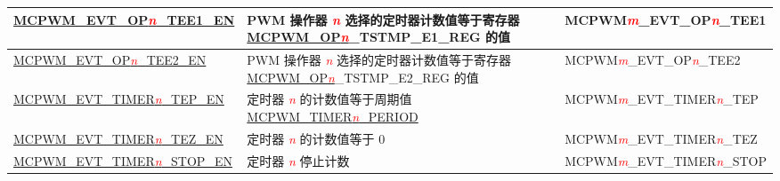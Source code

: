 \begin{ThreePartTable}
\begin{longtable}[c]{| l | L{7cm} | l |}
    \hyperref[fielddesc:MCPWMEVTOPNTEE1EN]{MCPWM\_EVT\_OP\textcolor{red}{\it{n}}\_TEE1\_EN}
    & PWM 操作器 \textcolor{red}{\it{n}} 选择的定时器计数值等于寄存器 \hyperref[regdesc:MCPWMOPNTSTMPE1REG]{MCPWM\_OP\textcolor{red}{\it{n}}}\_TSTMP\_E1\_REG 的值
    & MCPWM\textcolor{red}{\it{m}}\_EVT\_OP\textcolor{red}{\it{n}}\_TEE1    \\\hline
    \hyperref[fielddesc:MCPWMEVTOPNTEE2EN]{MCPWM\_EVT\_OP\textcolor{red}{\it{n}}\_TEE2\_EN}
    & PWM 操作器 \textcolor{red}{\it{n}} 选择的定时器计数值等于寄存器 \hyperref[regdesc:MCPWMOPNTSTMPE2REG]{MCPWM\_OP\textcolor{red}{\it{n}}}\_TSTMP\_E2\_REG 的值
    & MCPWM\textcolor{red}{\it{m}}\_EVT\_OP\textcolor{red}{\it{n}}\_TEE2    \\\hline
    \hyperref[fielddesc:MCPWMEVTTIMER0TEPEN]{MCPWM\_EVT\_TIMER\textcolor{red}{\it{n}}\_TEP\_EN}
    & 定时器 \textcolor{red}{\it{n}} 的计数值等于周期值 \hyperref[fielddesc:MCPWMTIMERNPERIOD]{MCPWM\_TIMER\textcolor{red}{\it{n}}\_PERIOD}
    & MCPWM\textcolor{red}{\it{m}}\_EVT\_TIMER\textcolor{red}{\it{n}}\_TEP    \\\hline
    \hyperref[fielddesc:MCPWMEVTTIMER0TEZEN]{MCPWM\_EVT\_TIMER\textcolor{red}{\it{n}}\_TEZ\_EN}
    & 定时器 \textcolor{red}{\it{n}} 的计数值等于 0
    & MCPWM\textcolor{red}{\it{m}}\_EVT\_TIMER\textcolor{red}{\it{n}}\_TEZ    \\\hline
    \hyperref[fielddesc:MCPWMEVTTIMER0STOPEN]{MCPWM\_EVT\_TIMER\textcolor{red}{\it{n}}\_STOP\_EN}
    & 定时器 \textcolor{red}{\it{n}} 停止计数
    & MCPWM\textcolor{red}{\it{m}}\_EVT\_TIMER\textcolor{red}{\it{n}}\_STOP   \\\hline
\end{longtable}
\end{ThreePartTable}